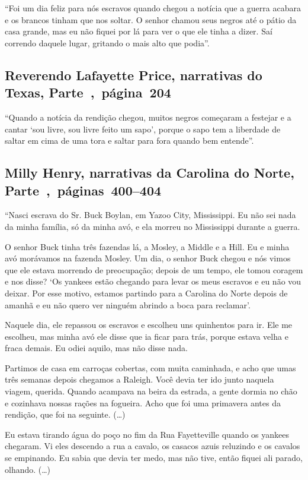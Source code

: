 ``Foi um dia feliz para nós escravos quando chegou a notícia que a
guerra acabara e os brancos tinham que nos soltar. O senhor chamou seus
negros até o pátio da casa grande, mas eu não fiquei por lá para ver o
que ele tinha a dizer. Saí correndo daquele lugar, gritando o mais alto
que podia''.

\subsection{Reverendo Lafayette Price, narrativas do Texas, Parte~,~página~204}
\label{ref215}

``Quando a notícia da rendição chegou, muitos negros começaram a
festejar e a cantar `sou livre, sou livre feito um sapo', porque o sapo
tem a liberdade de saltar em cima de uma tora e saltar para fora quando
bem entende''.

\subsection{Milly Henry, narrativas da Carolina do Norte, Parte~,~páginas~400--404}
\label{ref141}

``Nasci escrava do Sr. Buck Boylan, em Yazoo City, Mississippi. Eu não
sei nada da minha família, só da minha avó, e ela morreu no Mississippi
durante a guerra.

O senhor Buck tinha três fazendas lá, a Mosley, a Middle e a Hill. Eu e
minha avó morávamos na fazenda Mosley. Um dia, o senhor Buck chegou e
nós vimos que ele estava morrendo de preocupação; depois de um tempo,
ele tomou coragem e nos disse? `Os yankees estão chegando para levar os
meus escravos e eu não vou deixar. Por esse motivo, estamos partindo
para a Carolina do Norte depois de amanhã e eu não quero ver ninguém
abrindo a boca para reclamar'.

Naquele dia, ele repassou os escravos e escolheu uns quinhentos para ir.
Ele me escolheu, mas minha avó ele disse que ia ficar para trás, porque
estava velha e fraca demais. Eu odiei aquilo, mas não disse nada.

Partimos de casa em carroças cobertas, com muita caminhada, e acho que
umas três semanas depois chegamos a Raleigh. Você devia ter ido junto
naquela viagem, querida. Quando acampava na beira da estrada, a gente
dormia no chão e cozinhava nossas rações na fogueira. Acho que foi uma
primavera antes da rendição, que foi na seguinte. (\ldots{})

Eu estava tirando água do poço no fim da Rua Fayetteville quando os
yankees chegaram. Vi eles descendo a rua a cavalo, os casacos azuis
reluzindo e os cavalos se empinando. Eu sabia que devia ter medo, mas
não tive, então fiquei ali parado, olhando. (\ldots{})

